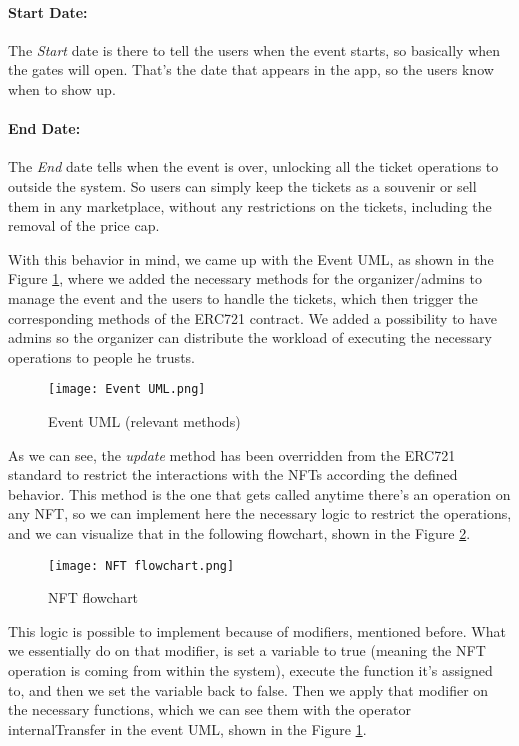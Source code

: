 \paragraph{Start Date:} The \textit{Start} date is there to tell the users when the event starts, so
basically when the gates will open. That's the date that appears in the app, so
the users know when to show up.

\paragraph{End Date:} The \textit{End} date tells when the event is over, unlocking all the ticket
operations to outside the system. So users can simply keep the tickets as a
souvenir or sell them in any marketplace, without any restrictions on the
tickets, including the removal of the price cap.

With this behavior in mind, we came up with the Event UML, as shown in the
Figure \ref{fig:event_uml}, where we added the necessary methods for the
organizer/admins to manage the event and the users to handle the tickets, which
then trigger the corresponding methods of the ERC721 contract. We added a
possibility to have admins so the organizer can distribute the workload of
executing the necessary operations to people he trusts.

\begin{figure}[H]
	\texttt{[image: Event UML.png]}
	\centering
	\caption{Event UML (relevant methods)}
	\label{fig:event_uml}
\end{figure}

As we can see, the \textit{update} method has been overridden from the ERC721
standard to restrict the interactions with the NFTs according the defined
behavior. This method is the one that gets called anytime there's an operation
on any NFT, so we can implement here the necessary logic to restrict the
operations, and we can visualize that in the following flowchart, shown in the
Figure \ref{fig:nft_flowchart}.

\begin{figure}[H]
	\texttt{[image: NFT flowchart.png]}
	\centering
	\caption{NFT flowchart}
	\label{fig:nft_flowchart}
\end{figure}

This logic is possible to implement because of modifiers, mentioned before.
What we essentially do on that modifier, is set a variable to true (meaning the
NFT operation is coming from within the system), execute the function it's
assigned to, and then we set the variable back to false. Then we apply that
modifier on the necessary functions, which we can see them with the operator
	{internalTransfer} in the event UML, shown in the Figure \ref{fig:event_uml}.

